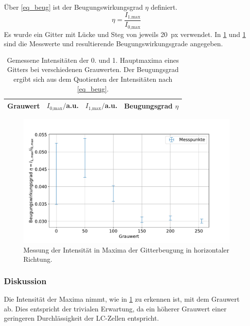 \documentclass[
	a4paper,
	12pt,
	pagesize,
	ngerman
]{scrartcl}
\begin{document}
		Über \cref{eq_beug} ist der Beugungswirkungsgrad $\eta$ definiert.
		\begin{equation}
			\label{eq_beug}
			\eta = \frac{I_\text{1,max}}{I_\text{0,max}}
		\end{equation}
		Es wurde ein Gitter mit Lücke und Steg von jeweils \SI{20}{px} verwendet.
		In \cref{tb_beug} und \cref{fig_beug} sind die Messwerte und resultierende Beugungswirkungsgrade angegeben.
\begin{table}[H]
		\centering
		\begin{tabular}{ c | c | c | c }
			 Grauwert & $I_\text{0,max}/$a.u. &$I_\text{1,max}/$a.u.&  Beugungsgrad $\eta$ \\ \hline
			 
		\end{tabular}
		\caption{
		Gemessene Intensitäten der 0. und 1. Hauptmaxima eines Gitters bei verschiedenen Grauwerten.
		Der Beugungsgrad ergibt sich aus dem Quotienten der Intensitäten nach \cref{eq_beug}.
		}
		\label{tb_beug}
\end{table}
\begin{figure}[H] %
			\includegraphics[width=0.8\linewidth]{img/beugungsgrad}
			\caption{
			Messung der Intensität in Maxima der Gitterbeugung in horizontaler Richtung.
			}
			\label{fig_beug}
	\end{figure}
			\subsubsection*{Diskussion}
			Die Intensität der Maxima nimmt, wie in \cref{tb_beug} zu erkennen ist, mit dem Grauwert ab.
			Dies entspricht der trivialen Erwartung, da ein höherer Grauwert einer geringeren Durchlässigkeit der LC-Zellen entspricht.
\end{document}
